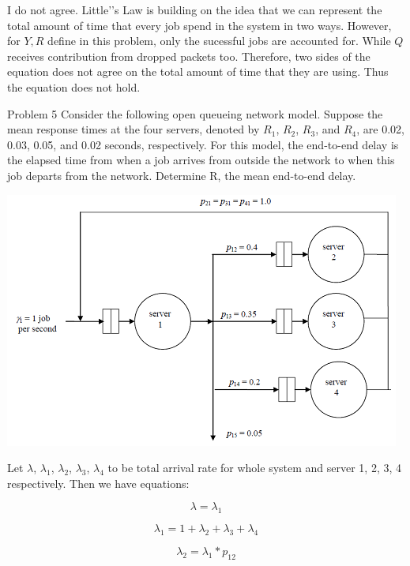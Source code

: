 \documentclass[12pt]{article}
\begin{document}
\begin{enumerate}
I do not agree. Little'’s Law is building on the idea that we can represent the total amount of time that every job spend in the system in two ways. However, for $Y, R$ define in this problem, only the sucessful jobs are accounted for. While $Q$ receives contribution from dropped packets too. Therefore, two sides of the equation does not agree on the total amount of time that they are using. Thus the equation does not hold.

\begin{minipage}{\textwidth}
\item{Problem 5}
Consider the following open queueing network model. Suppose the mean response times at the four servers, denoted by $R_1$, $R_2$, $R_3$, and $R_4$, are 0.02, 0.03, 0.05, and 0.02 seconds, respectively. For this model, the end-to-end delay is the elapsed time from when a job arrives from outside the network to when this job departs from the network. Determine R, the mean end-to-end delay.

\includegraphics[width=\textwidth]{a1q5.png}
\end{minipage}

Let $\lambda$, $\lambda_1$, $\lambda_2$, $\lambda_3$, $\lambda_4$ to be total arrival rate for whole system and server 1, 2, 3, 4 respectively. Then we have equations:

\begin{equation}
\lambda = \lambda_1
\end{equation}

\begin{equation}
\lambda_1 = 1 + \lambda_2 + \lambda_3 + \lambda_4
\end{equation}

\begin{equation}
\lambda_2 = \lambda_1 * p_{12}
\end{equation}


\end{enumerate}
\end{document}
